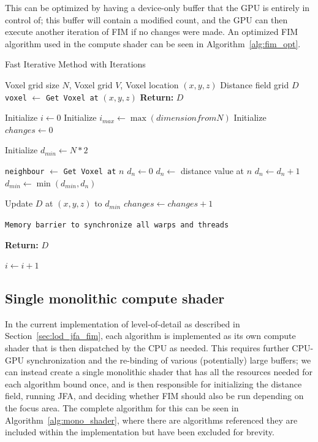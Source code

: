 This can be optimized by having a device-only buffer that the GPU is entirely in control of; this buffer will contain a
modified count, and the GPU can then execute another iteration of FIM if no changes were made. An optimized FIM
algorithm used in the compute shader can be seen in Algorithm~\ref{alg:fim_opt}.

\begin{algorithm}[H]
    \caption{Fast Iterative Method with Iterations}
    \label{alg:fim_opt}
    \begin{algorithmic}[1]
        \REQUIRE Voxel grid size \(N\), Voxel grid \(V\), Voxel location \((x, y, z)\)
        \ENSURE Distance field grid \(D\)
        \STATE \texttt{voxel} $\gets$ \texttt{Get Voxel at} \((x, y, z)\)
        \STATE \textbf{Return:} \(D\)
        \ENDIF

        \STATE Initialize $i \gets 0$
        \STATE Initialize $i_{max} \gets \max(dimension from N)$
        \STATE Initialize $changes \gets 0$

        \STATE Initialize $d_{min} \gets N * 2$

        \STATE \texttt{neighbour} $\gets$ \texttt{Get Voxel at} $n$
        \STATE $d_n \gets 0$
        \ELSE
        \STATE $d_n \gets$ distance value at $n$
        \ENDIF
        \STATE $d_n \gets d_n + 1$
        \STATE $d_{min} \gets \min(d_{min}, d_n)$
        \ENDFOR

        \STATE Update $D$ at $(x, y, z)$ to $d_{min}$
        \STATE $changes \gets changes + 1$
        \ENDIF

        \STATE \texttt{Memory barrier to synchronize all warps and threads}

        \STATE \textbf{Return:} \(D\)
        \ENDIF

        \STATE $i \gets i + 1$
        \ENDFOR
    \end{algorithmic}
\end{algorithm}

\subsection{Single monolithic compute shader} \label{sec:mono_shader}
In the current implementation of level-of-detail as described in Section~\ref{sec:lod_jfa_fim}, each algorithm is
implemented as its own compute shader that is then dispatched by the CPU as needed. This requires further CPU-GPU
synchronization and the re-binding of various (potentially) large buffers; we can instead create a single monolithic
shader that has all the resources needed for each algorithm bound once, and is then responsible for initializing the
distance field, running JFA, and deciding whether FIM should also be run depending on the focus area. The complete
algorithm for this can be seen in Algorithm~\ref{alg:mono_shader}, where there are algorithms referenced they are
included within the implementation but have been excluded for brevity.

